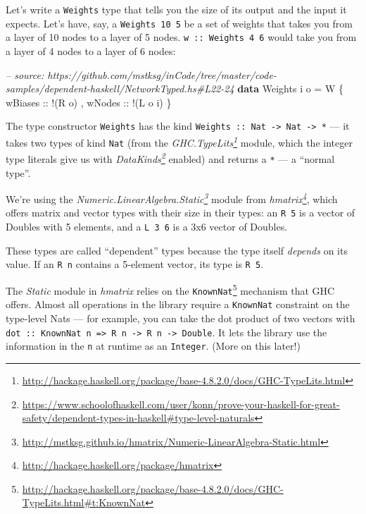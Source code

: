 \documentclass[]{article}
\newenvironment{Shaded}{}{}
\newcommand{\KeywordTok}[1]{\textcolor[rgb]{0.00,0.44,0.13}{\textbf{{#1}}}}
\newcommand{\DataTypeTok}[1]{\textcolor[rgb]{0.56,0.13,0.00}{{#1}}}
\newcommand{\CommentTok}[1]{\textcolor[rgb]{0.38,0.63,0.69}{\textit{{#1}}}}
\newcommand{\OtherTok}[1]{\textcolor[rgb]{0.00,0.44,0.13}{{#1}}}
\newcommand{\FunctionTok}[1]{\textcolor[rgb]{0.02,0.16,0.49}{{#1}}}
\newcommand{\NormalTok}[1]{{#1}}
\renewcommand{\href}[2]{#2\footnote{\url{#1}}}
\begin{document}
Let's write a \texttt{Weights} type that tells you the size of its output and
the input it expects. Let's have, say, a \texttt{Weights\ 10\ 5} be a set of
weights that takes you from a layer of 10 nodes to a layer of 5 nodes.
\texttt{w\ ::\ Weights\ 4\ 6} would take you from a layer of 4 nodes to a layer
of 6 nodes:

\begin{Shaded}
\begin{Highlighting}[]
\CommentTok{-- source: https://github.com/mstksg/inCode/tree/master/code-samples/dependent-haskell/NetworkTyped.hs#L22-24}
\KeywordTok{data} \DataTypeTok{Weights} \NormalTok{i o }\FunctionTok{=} \DataTypeTok{W} \NormalTok{\{}\OtherTok{ wBiases ::} \FunctionTok{!}\NormalTok{(}\DataTypeTok{R} \NormalTok{o)}
                     \NormalTok{,}\OtherTok{ wNodes  ::} \FunctionTok{!}\NormalTok{(}\DataTypeTok{L} \NormalTok{o i)}
                     \NormalTok{\}}
\end{Highlighting}
\end{Shaded}

The type constructor \texttt{Weights} has the kind
\texttt{Weights\ ::\ Nat\ -\textgreater{}\ Nat\ -\textgreater{}\ *} --- it takes
two types of kind \texttt{Nat} (from the
\emph{\href{http://hackage.haskell.org/package/base-4.8.2.0/docs/GHC-TypeLits.html}{GHC.TypeLits}}
module, which the integer type literals give us with
\emph{\href{https://www.schoolofhaskell.com/user/konn/prove-your-haskell-for-great-safety/dependent-types-in-haskell\#type-level-naturals}{DataKinds}}
enabled) and returns a \texttt{*} --- a ``normal type''.

We're using the
\emph{\href{http://mstksg.github.io/hmatrix/Numeric-LinearAlgebra-Static.html}{Numeric.LinearAlgebra.Static}}
module from \emph{\href{http://hackage.haskell.org/package/hmatrix}{hmatrix}},
which offers matrix and vector types with their size in their types: an
\texttt{R\ 5} is a vector of Doubles with 5 elements, and a \texttt{L\ 3\ 6} is
a 3x6 vector of Doubles.

These types are called ``dependent'' types because the type itself
\emph{depends} on its value. If an \texttt{R\ n} contains a 5-element vector,
its type is \texttt{R\ 5}.

The \emph{Static} module in \emph{hmatrix} relies on the
\href{http://hackage.haskell.org/package/base-4.8.2.0/docs/GHC-TypeLits.html\#t:KnownNat}{\texttt{KnownNat}}
mechanism that GHC offers. Almost all operations in the library require a
\texttt{KnownNat} constraint on the type-level Nats --- for example, you can
take the dot product of two vectors with
\texttt{dot\ ::\ KnownNat\ n\ =\textgreater{}\ R\ n\ -\textgreater{}\ R\ n\ -\textgreater{}\ Double}.
It lets the library use the information in the \texttt{n} at runtime as an
\texttt{Integer}. (More on this later!)
\end{document}
